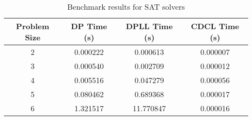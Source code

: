 \begin{table}[H]
\centering
\begin{tabular}{|c|c|c|c|}
\hline
Problem Size & DP Time (s) & DPLL Time (s) & CDCL Time (s) \\
\hline
2 & 0.000222 & 0.000613 & 0.000007 \\
3 & 0.000540 & 0.002709 & 0.000012 \\
4 & 0.005516 & 0.047279 & 0.000056 \\
5 & 0.080462 & 0.689368 & 0.000017 \\
6 & 1.321517 & 11.770847 & 0.000016 \\
\hline
\end{tabular}
\caption{Benchmark results for SAT solvers}
\label{tab:sat_benchmarks}
\end{table}
